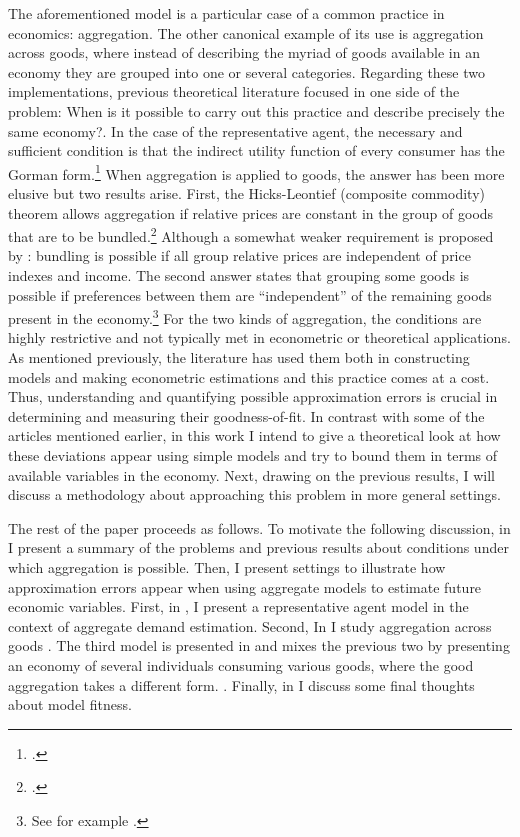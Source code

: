 \documentclass[english, a4paper,12pt]{article}
\begin{document}
The aforementioned model is a particular case of a common practice in economics: aggregation. The other canonical example of its use is aggregation across goods, where instead of describing the myriad of goods available in an economy they are grouped into one or several categories. Regarding these two implementations, previous theoretical literature focused in one side of the problem: When is it possible to carry out this practice and describe precisely the same economy?. In the case of the representative agent, the necessary and sufficient condition is that the indirect utility function of every consumer has the Gorman form.\footnote{\cite{Gorman53}.} When aggregation is applied to goods, the answer has been more elusive but two results arise. First, the Hicks-Leontief (composite commodity) theorem allows aggregation if relative prices are constant in the group of goods that are to be bundled.\footnote{\cite{Leontief36, HicksBook}.} Although a somewhat weaker requirement is proposed by \cite{Lewbel96}: bundling is possible if all group relative prices are independent of price indexes and income. The second answer states that grouping some goods is possible if preferences between them are ``independent'' of the remaining goods present in the economy.\footnote{See for example \cite{GormanSeparability}.} For the two kinds of aggregation, the conditions are highly restrictive and not typically met in econometric or theoretical applications. As mentioned previously, the literature has used them both in constructing models and making econometric estimations and this practice comes at a cost. Thus, understanding and quantifying possible approximation errors is crucial in determining and measuring their goodness-of-fit. In contrast with some of the articles mentioned earlier, in this work I intend to give a theoretical look at how these deviations appear using simple models and try to bound them in terms of available variables in the economy. Next, drawing on the previous results, I will discuss a methodology about approaching this problem in more general settings.

The rest of the paper proceeds as follows. To motivate the following discussion, in  I present a summary of the problems and previous results about conditions under which aggregation is possible. Then, I present  settings to illustrate how approximation errors appear when using aggregate models to estimate future economic variables. First, in , I present a representative agent model in the context of aggregate demand estimation. Second, In  I study aggregation across goods . The third model is presented in  and mixes the previous two by presenting an economy of several individuals consuming various goods, where the good aggregation takes a different form. . Finally, in  I discuss some final thoughts about model fitness.
\end{document}
